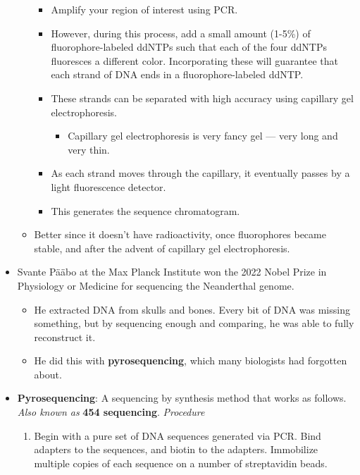 \documentclass[../notes.tex]{subfiles}
\begin{document}
\begin{itemize}
\begin{itemize}
        \begin{itemize}
            \item Amplify your region of interest using PCR.
            \item However, during this process, add a small amount (1-5\%) of fluorophore-labeled ddNTPs such that each of the four ddNTPs fluoresces a different color. Incorporating these will guarantee that each strand of DNA ends in a fluorophore-labeled ddNTP.
            \item These strands can be separated with high accuracy using capillary gel electrophoresis.
            \begin{itemize}
                \item Capillary gel electrophoresis is very fancy gel --- very long and very thin.
            \end{itemize}
            \item As each strand moves through the capillary, it eventually passes by a light fluorescence detector.
            \item This generates the sequence chromatogram.
        \end{itemize}
        \item Better since it doesn't have radioactivity, once fluorophores became stable, and after the advent of capillary gel electrophoresis.
    \end{itemize}
    \item Svante P\"{a}\"{a}bo at the Max Planck Institute won the 2022 Nobel Prize in Physiology or Medicine for sequencing the Neanderthal genome.
    \begin{itemize}
        \item He extracted DNA from skulls and bones. Every bit of DNA was missing something, but by sequencing enough and comparing, he was able to fully reconstruct it.
        \item He did this with \textbf{pyrosequencing}, which many biologists had forgotten about.
    \end{itemize}
    \item \textbf{Pyrosequencing}: A sequencing by synthesis method that works as follows. \emph{Also known as} \textbf{454 sequencing}. \emph{Procedure}
    \begin{enumerate}
        \item Begin with a pure set of DNA sequences generated via PCR. Bind adapters to the sequences, and biotin to the adapters. Immobilize multiple copies of each sequence on a number of streptavidin beads.

\end{enumerate}
\end{itemize}
\end{document}
